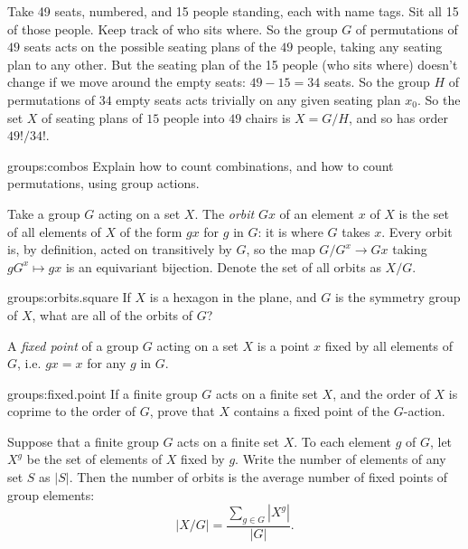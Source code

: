 \begin{example}
Take 49 seats, numbered, and 15 people standing, each with name tags.
Sit all 15 of those people.
Keep track of who sits where.
So the group \(G\) of permutations of \(49\) seats acts on the possible seating plans of the \(49\) people, taking any seating plan to any other.
But the seating plan of the 15 people (who sits where) doesn't change if we move around the empty seats: \(49-15=34\) seats.
So the group \(H\) of permutations of \(34\) empty seats acts trivially on any given seating plan \(x_0\).
So the set \(X\) of seating plans of \(15\) people into \(49\) chairs is \(X=G/H\), and so has order \(49!/34!\).
\end{example}
\begin{problem}{groups:combos}
Explain how to count combinations, and how to count permutations, using group actions.
\end{problem}
Take a group \(G\) acting on a set \(X\).
The \emph{orbit} \(Gx\) of an element \(x\) of \(X\) is the set of all elements of \(X\) of the form \(gx\) for \(g\) in \(G\): it is where \(G\) takes \(x\).
Every orbit is, by definition, acted on transitively by \(G\), so the map \(G/G^x \to Gx\) taking \(gG^x \mapsto gx\) is an equivariant bijection.
Denote the set of all orbits as \(X/G\).
\begin{problem}{groups:orbits.square}
If \(X\) is a hexagon in the plane, and \(G\) is the symmetry group of \(X\), what are all of the orbits of \(G\)?
\end{problem}
A \emph{fixed point} of a group \(G\) acting on a set \(X\) is a point \(x\) fixed by all elements of \(G\), i.e. \(gx=x\) for any \(g\) in \(G\).
\begin{problem}{groups:fixed.point}
If a finite group \(G\) acts on a finite set \(X\), and the order of \(X\) is coprime to the order of \(G\), prove that \(X\) contains a fixed point of the \(G\)-action.
\end{problem}
\begin{theorem}[Burnside]
Suppose that a finite group \(G\) acts on a finite set \(X\).
To each element \(g\) of \(G\), let \(X^g\) be the set of elements of \(X\) fixed by \(g\).
Write the number of elements of any set \(S\) as \(|S|\).
Then the number of orbits is the average number of fixed points of group elements:
\[
|X/G|
=
\frac{\sum_{g \in G} |X^g|}{|G|}.
\]
\end{theorem}
